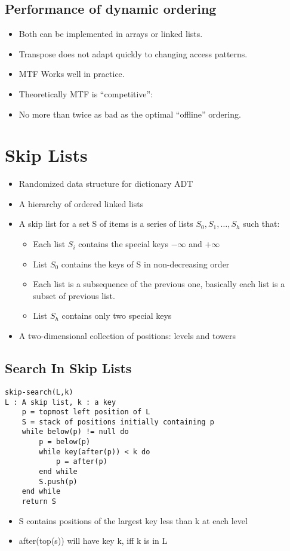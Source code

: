 \documentclass{article}
\begin{document}
\subsection{Performance of dynamic ordering}
\begin{itemize}
\item Both can be implemented in arrays or linked lists.
\item Transpose does not adapt quickly to changing access patterns.
\item MTF Works well in practice.
\item Theoretically MTF is “competitive”:
\item No more than twice as bad as the optimal “offline” ordering.
\end{itemize}

\section{Skip Lists}
\begin{itemize}
\item Randomized data structure for dictionary ADT 
\item A hierarchy of ordered linked lists
\item A skip list for a set S of items is a series of lists \(S_0,S_1, \ldots ,S_h\) such that:
\begin{itemize}
\item Each list \(S_i\) contains the special keys \(-\infty\) and \(+\infty\)
\item List \(S_0\) contains the keys of S in non-decreasing order 
\item Each list is a subsequence of the previous one, basically each list is a subset of previous list.
\item List \(S_h\) contains only two special keys 
\end{itemize}
\item A two-dimensional collection of positions: levels and towers
\end{itemize}

\subsection*{Search In Skip Lists}
\begin{lstlisting}
skip-search(L,k)
L : A skip list, k : a key 
	p = topmost left position of L
	S = stack of positions initially containing p 
	while below(p) != null do 
		p = below(p)
		while key(after(p)) < k do
			p = after(p)
		end while 
		S.push(p)
	end while
	return S 
\end{lstlisting}
\begin{itemize}
\item S contains positions of the largest key less than k at each level 
\item after(top(s)) will have key k, iff k is in L
\end{itemize}
\end{document}
